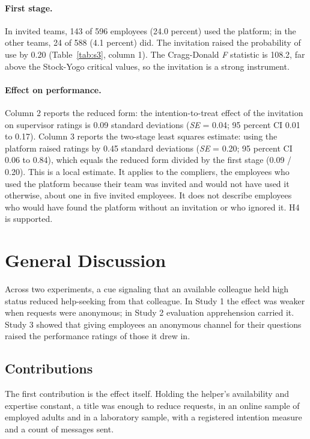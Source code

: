 \documentclass[11pt]{article}
\begin{document}
\paragraph{First stage.} In invited teams, 143 of 596 employees (24.0 percent) used the platform; in the other teams, 24 of 588 (4.1 percent) did. The invitation raised the probability of use by 0.20 (Table~\ref{tab:s3}, column 1). The Cragg-Donald {\itshape F} statistic is 108.2, far above the Stock-Yogo critical values, so the invitation is a strong instrument.

\paragraph{Effect on performance.} Column 2 reports the reduced form: the intention-to-treat effect of the invitation on supervisor ratings is 0.09 standard deviations (\textit{SE} = 0.04; 95 percent CI 0.01 to 0.17). Column 3 reports the two-stage least squares estimate: using the platform raised ratings by 0.45 standard deviations (\textit{SE} = 0.20; 95 percent CI 0.06 to 0.84), which equals the reduced form divided by the first stage (0.09 / 0.20). This is a local estimate. It applies to the compliers, the employees who used the platform because their team was invited and would not have used it otherwise, about one in five invited employees. It does not describe employees who would have found the platform without an invitation or who ignored it. H4 is supported.

\section{General Discussion}

Across two experiments, a cue signaling that an available colleague held high status reduced help-seeking from that colleague. In Study 1 the effect was weaker when requests were anonymous; in Study 2 evaluation apprehension carried it. Study 3 showed that giving employees an anonymous channel for their questions raised the performance ratings of those it drew in.

\subsection{Contributions}

The first contribution is the effect itself. Holding the helper's availability and expertise constant, a title was enough to reduce requests, in an online sample of employed adults and in a laboratory sample, with a registered intention measure and a count of messages sent.
\end{document}
